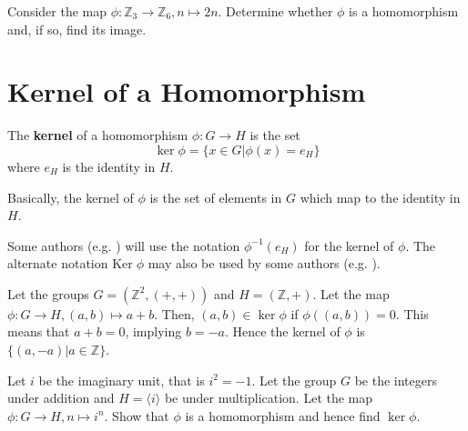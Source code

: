 \begin{exercise}
    Consider the map $\phi: \mathbb{Z}_3 \to \mathbb{Z}_6, n \mapsto 2n$. Determine whether $\phi$ is a homomorphism and, if so, find its image.
\end{exercise}

\section{Kernel of a Homomorphism}
\begin{definition}
    The \textbf{kernel} of a homomorphism $\phi: G \to H$ is the set
    \[
        \ker\phi = \{x \in G \vert \phi(x) = e_H\}
    \]
    where $e_H$ is the identity in $H$.
\end{definition}
Basically, the kernel of $\phi$ is the set of elements in $G$ which map to the identity in $H$.

\begin{remark}
    Some authors (e.g. \cite{libretexts_im-and-ker}) will use the notation $\phi^{-1}(e_H)$ for the kernel of $\phi$. The alternate notation $\mathrm{Ker}\;\phi$ may also be used by some authors (e.g. \cite{clark_1984, hungerford_1980}).
\end{remark}

\begin{example}
    Let the groups $G = (\mathbb{Z}^2, (+, +))$ and $H = (\mathbb{Z}, +)$. Let the map $\phi: G \to H, (a, b) \mapsto a+b$. Then, $(a, b) \in \ker\phi$ if $\phi((a,b)) = 0$. This means that $a+b = 0$, implying $ b = -a$. Hence the kernel of $\phi$ is $\{(a, -a) \vert a \in \mathbb{Z}\}$.
\end{example}

\begin{exercise}
    Let $i$ be the imaginary unit, that is $i^2 = -1$. Let the group $G$ be the integers under addition and $H = \langle i \rangle$ be under multiplication. Let the map $\phi: G \to H, n \mapsto i^n$.  Show that $\phi$ is a homomorphism and hence find $\ker\phi$.
\end{exercise}


